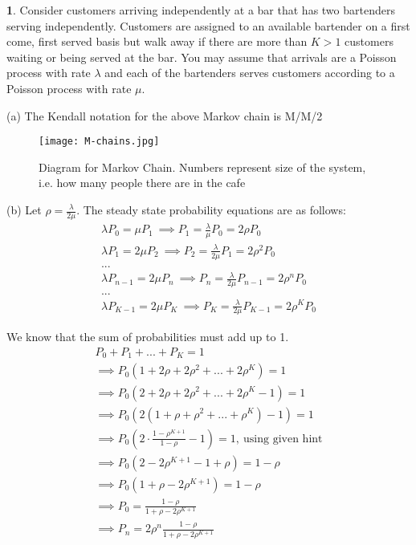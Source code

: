 \textbf{1}. Consider customers arriving independently at a bar that has two bartenders serving independently. Customers are assigned to an available bartender on a first come, first served basis
but walk away if there are more than $K > 1$ customers waiting or being served at the bar. You
may assume that arrivals are a Poisson process with rate $\lambda$ and each of the bartenders serves
customers according to a Poisson process with rate $\mu$.

(a) 
The Kendall notation for the above Markov chain is M/M/2
\begin{figure}[H]
\centering
\texttt{[image: M-chains.jpg]}
\caption{\label{fig:M-chains}Diagram for Markov Chain. Numbers represent size of the system, i.e. how many people there are in the cafe}
\end{figure}

(b) Let $\rho = \frac{\lambda}{2\mu}$. The steady state probability equations are as follows:
\begin{gather*}
\lambda P_0  = \mu P_1\ \implies P_1 = \frac{\lambda}{\mu}P_0 = 2\rho P_0\\
\lambda P_1 = 2\mu P_2\ \implies P_2 = \frac{\lambda}{2\mu}P_1 = 2\rho^2 P_0\\
...\\
\lambda P_{n-1} = 2\mu P_{n}\ \implies P_n = \frac{\lambda}{2\mu}P_{n-1} = 2\rho^n P_0\\
...\\
\lambda P_{K-1} = 2\mu P_{K}\ \implies P_K = \frac{\lambda}{2\mu}P_{K-1} = 2\rho^K P_0
\end{gather*}

We know that the sum of probabilities must add up to 1.
\begin{gather*}
P_0 + P_1 + ... + P_K = 1\\
\implies P_0(1 + 2\rho + 2\rho^2 + ... + 2\rho^K) = 1\\
\implies P_0(2 + 2\rho + 2\rho^2 + ... + 2\rho^K-1) = 1\\
\implies P_0(2(1 + \rho + \rho^2 + ... + \rho^K) - 1) = 1\\
\implies P_0(2\cdot \frac{1 - \rho^{K+1}}{1-\rho} - 1) = 1, \ \text{using given hint} \\
\implies P_0(2 - 2\rho^{K+1} - 1 + \rho) = 1 - \rho\\
\implies P_0(1 + \rho - 2\rho^{K+1}) = 1 - \rho\\
\implies P_0 = \frac{1-\rho}{1+\rho - 2\rho^{K+1}}\\
\implies P_n = 2\rho^n\frac{1-\rho}{1+\rho - 2\rho^{K+1}}
\end{gather*}

